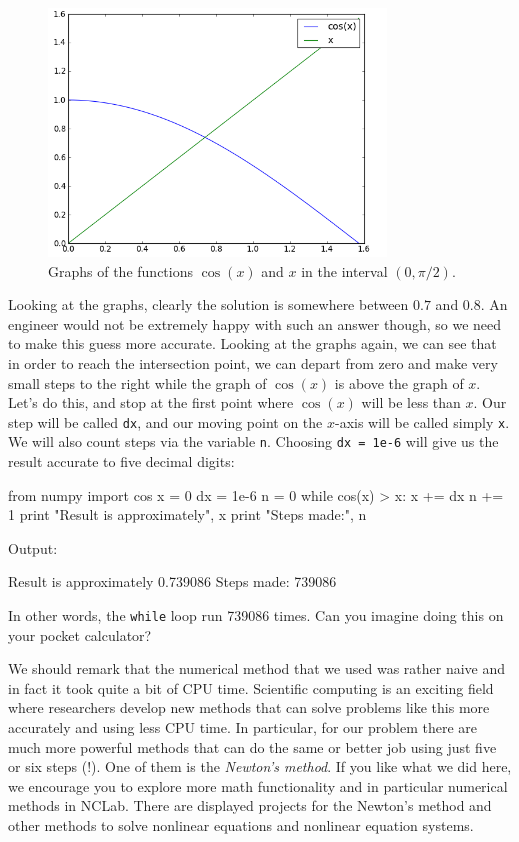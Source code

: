 \begin{figure}[!ht]
\begin{center}
\includegraphics[width=0.8\textwidth]{imgp/xcosx.png}
\end{center}
\vspace{-2mm}
\caption{Graphs of the functions $\cos(x)$ and $x$ in the interval $(0, \pi/2)$.}
\label{fig:xcosx}
\end{figure}
\noindent
Looking at the graphs, clearly the solution is somewhere 
between $0.7$ and $0.8$. 
An engineer would not be extremely happy with such an answer though, 
so we need to make this guess more accurate. Looking at the graphs again, we can see
that in order to reach the intersection point, we can depart from zero and make very 
small steps to the right while the graph of $\cos(x)$ is above the graph of $x$.
Let's do this, and stop 
at the first point where $\cos(x)$ will be less than $x$. Our step will be called {\tt dx},
and our moving point on the $x$-axis will be called simply {\tt x}. We will also count 
steps via the variable {\tt n}. Choosing {\tt dx = 1e-6} will give us the result accurate 
to five decimal digits:

\begin{bluecode}
from numpy import cos
x = 0
dx = 1e-6
n = 0
while cos(x) > x:
    x += dx
    n += 1
print "Result is approximately", x
print "Steps made:", n
\end{bluecode}
Output:

\begin{bluecode}
Result is approximately 0.739086
Steps made: 739086
\end{bluecode}
In other words, the {\tt while} loop run 739086 times. Can you 
imagine doing this on your pocket calculator?

We should remark that the numerical method that we used was rather 
naive and in fact it took quite a bit of CPU time. Scientific computing
is an exciting field where researchers develop new methods that 
can solve problems like this more accurately and using less CPU time. 
In particular, for our problem there are much more powerful methods that can do the
same or better job using just five or six steps (!). One of them 
is the {\em Newton's method}. If you like what we did here, we encourage 
you to explore more math functionality and in particular numerical 
methods in NCLab. There are displayed projects for the Newton's method
and other methods to solve nonlinear equations and nonlinear equation systems.

